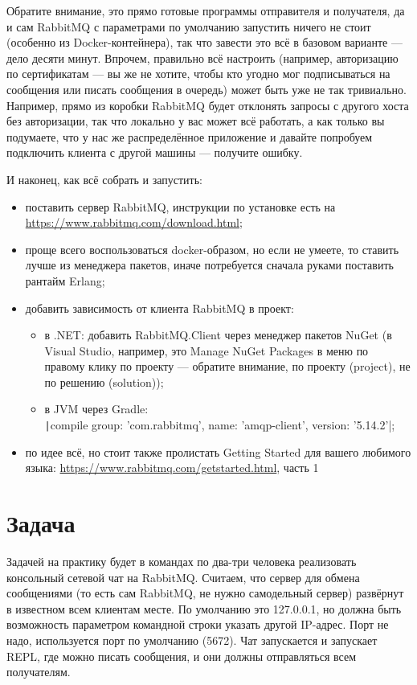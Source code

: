 \documentclass[a5paper]{article}
\begin{document}
Обратите внимание, это прямо готовые программы отправителя и получателя, да и сам RabbitMQ с параметрами по умолчанию запустить ничего не стоит (особенно из Docker-контейнера), так что завести это всё в базовом варианте --- дело десяти минут. Впрочем, правильно всё настроить (например, авторизацию по сертификатам --- вы же не хотите, чтобы кто угодно мог подписываться на сообщения или писать сообщения в очередь) может быть уже не так тривиально. Например, прямо из коробки RabbitMQ будет отклонять запросы с другого хоста без авторизации, так что локально у вас может всё работать, а как только вы подумаете, что у нас же распределённое приложение и давайте попробуем подключить клиента с другой машины --- получите ошибку.

И наконец, как всё собрать и запустить:

\begin{itemize}
    \item поставить сервер RabbitMQ, инструкции по установке есть на \url{https://www.rabbitmq.com/download.html};
    \item проще всего воспользоваться docker-образом, но если не умеете, то ставить лучше из менеджера пакетов, иначе потребуется сначала руками поставить рантайм Erlang;
    \item добавить зависимость от клиента RabbitMQ в проект:
    \begin{itemize}
        \item в .NET: добавить RabbitMQ.Client через менеджер пакетов NuGet (в Visual Studio, например, это Manage NuGet Packages в меню по правому клику по проекту --- обратите внимание, по проекту (project), не по решению (solution));
        \item в JVM через Gradle: \\
        \texttt|compile group: 'com.rabbitmq', name: 'amqp-client', version: '5.14.2'|;
    \end{itemize}
    \item по идее всё, но стоит также пролистать Getting Started для вашего любимого языка: \url{https://www.rabbitmq.com/getstarted.html}, часть 1
\end{itemize}

\section{Задача}

Задачей на практику будет в командах по два-три человека реализовать консольный сетевой чат на RabbitMQ. Считаем, что сервер для обмена сообщениями (то есть сам RabbitMQ, не нужно самодельный сервер) развёрнут в известном всем клиентам месте. По умолчанию это 127.0.0.1, но должна быть возможность параметром командной строки указать другой IP-адрес. Порт не надо, используется порт по умолчанию (5672). Чат запускается и запускает REPL, где можно писать сообщения, и они должны отправляться всем получателям.
\end{document}
